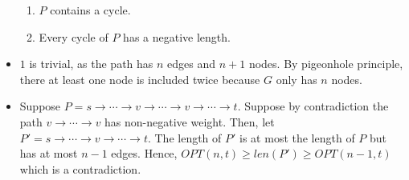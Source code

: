 \documentclass[a4paper,12pt]{article}
\begin{document}
\begin{itemize}
\begin{enumerate}
        \item $P$ contains a cycle.
        \item Every cycle of $P$ has a negative length.
    \end{enumerate}
    \item $1$ is trivial, as the path has $n$ edges and $n+1$ nodes. By pigeonhole principle, there at least one node is included twice because $G$ only has $n$ nodes.
    \item Suppose $P=s\to\cdots\to v\to\cdots\to v\to\cdots\to t.$ Suppose by contradiction the path $v\to\cdots\to v$ has non-negative weight. Then, let $P'=s\to\cdots\to v\to\cdots\to t.$ The length of $P'$ is at most the length of $P$ but has at most $n-1$ edges. Hence, $OPT(n,t)\geq len(P')\geq OPT(n-1,t)$ which is a contradiction.
\end{itemize}
\end{document}
